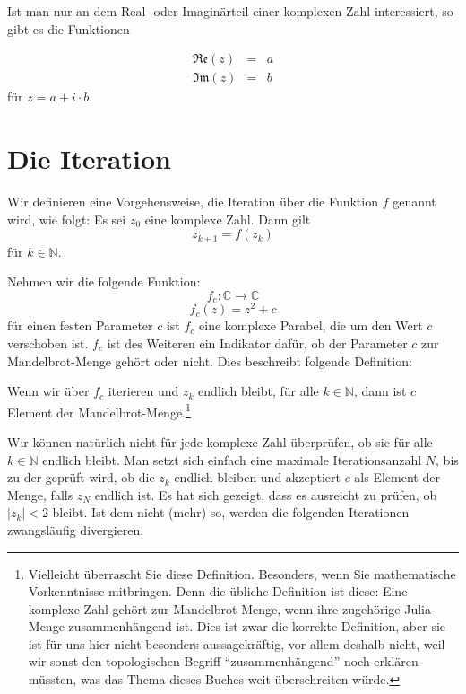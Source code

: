 Ist man nur an dem Real- oder Imaginärteil einer komplexen Zahl interessiert, so gibt es die Funktionen

\begin{eqnarray}
\mathfrak{Re}(z) &=& a \\
\mathfrak{Im}(z) &=& b
\end{eqnarray}
für $z=a+i\cdot b$.

\section{Die Iteration}
\begin{definition}
Wir definieren eine Vorgehensweise, die Iteration über die Funktion $f$ genannt wird, wie folgt: Es sei $z_0$ eine komplexe Zahl. Dann gilt
\begin{equation}
z_{k+1} = f(z_k)
\end{equation}
für $k\in \mathbb{N}$.
\end{definition}

Nehmen wir die folgende Funktion:
\begin{equation*}
f_c : \mathbb{C} \longrightarrow \mathbb{C}
\end{equation*}
\begin{equation}\label{eq:mand}
f_c(z) = z^2+c
\end{equation}
für einen festen Parameter $c$ ist $f_c$ eine komplexe Parabel, die um den Wert $c$ verschoben ist. $f_c$ ist des Weiteren ein Indikator dafür, ob der Parameter $c$ zur Mandelbrot-Menge gehört oder nicht. Dies beschreibt folgende Definition:

\begin{definition}
Wenn wir über $f_c$ iterieren und $z_k$ endlich bleibt, für alle $k\in \mathbb{N}$, dann ist $c$ Element der Mandelbrot-Menge.\footnote{Vielleicht überrascht Sie diese Definition. Besonders, wenn Sie mathematische Vorkenntnisse mitbringen. Denn die übliche Definition ist diese: Eine komplexe Zahl gehört zur Mandelbrot-Menge, wenn ihre zugehörige Julia-Menge zusammenhängend ist. Dies ist zwar die korrekte Definition, aber sie ist für uns hier nicht besonders aussagekräftig, vor allem deshalb nicht, weil wir sonst den topologischen Begriff "`zusammenhängend"' noch erklären müssten, was das Thema dieses Buches weit überschreiten würde.}
\end{definition}

Wir können natürlich nicht für jede komplexe Zahl überprüfen, ob sie für alle $k\in \mathbb{N}$ endlich bleibt. Man setzt sich einfach eine maximale Iterationsanzahl $N$, bis zu der geprüft wird, ob die $z_k$ endlich bleiben und akzeptiert $c$ als Element der Menge, falls $z_N$ endlich ist. Es hat sich gezeigt, dass es ausreicht zu prüfen, ob $\vert z_k\vert <2$ bleibt. Ist dem nicht (mehr) so, werden die folgenden Iterationen zwangsläufig divergieren. 

